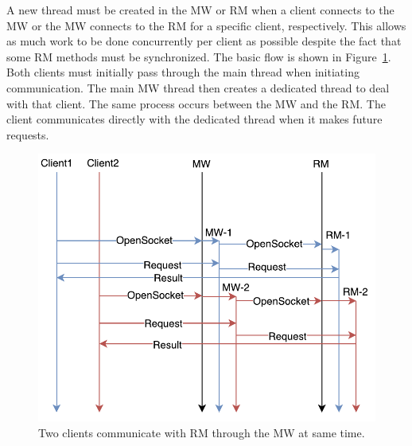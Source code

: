 \documentclass{article}
\begin{document}
A new thread must be created in the MW or RM when a client connects to the MW or the MW connects to the RM for a specific client, respectively. This allows as much work to be done concurrently per client as possible despite the fact that some RM methods must be synchronized. The basic flow is shown in Figure~\ref{f:threads}. Both clients must initially pass through the main thread when initiating communication. The main MW thread then creates a dedicated thread to deal with that client. The same process occurs between the MW and the RM. The client communicates directly with the dedicated thread when it makes future requests.

\begin{figure}
\centering
\includegraphics[scale=1]{figures/threads.pdf}
\caption{Two clients communicate with RM through the MW at same time.}
\label{f:threads}
\end{figure} 
\end{document}
